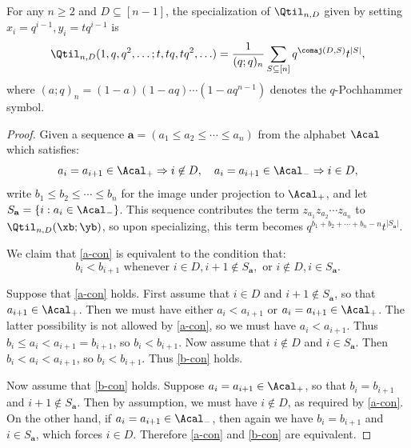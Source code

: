 
\begin{prop}\label{prop:q-ps}
    For any $n \ge 2$ and $D \subseteq [n-1]$, the specialization of $\Qtil_{n,D}$ given by setting $x_i = q^{i-1}, y_i = tq^{i-1}$ is
    \[
    \Qtil_{n,D}(1,q,q^2,\ldots;t,tq,tq^2,\ldots) = \frac{1}{(q;q)_n} \sum_{S \subseteq [n]} q^{\comaj(D,S)}t^{|S|},
    \]
    where $(a;q)_n = (1-a)(1-aq) \cdots (1-aq^{n-1})$ denotes the $q$-Pochhammer symbol.
\end{prop}
\begin{proof}
    Given a sequence $\mathbf{a} = (a_1 \le a_2 \le \cdots \le a_n)$ from the alphabet $\Acal$ which satisfies:
    \begin{equation}\label{a-con}
a_i = a_{i+1} \in \Acal_+ \Rightarrow i \not\in D, \quad a_i = a_{i+1} \in \Acal_- \Rightarrow i \in D,
\end{equation}
write $b_1 \le b_2 \le \cdots \le b_n$ for the image under projection to $\Acal_+$, and let $S_\mathbf{a} = \{ i : a_i \in \Acal_- \}$. This sequence contributes the term $z_{a_1}z_{a_2} \cdots z_{a_n}$ to $\Qtil_{n,D}(\xb;\yb)$, so upon specializing, this term becomes $q^{b_1 + b_2 + \cdots + b_n - n}t^{|S_\mathbf{a}|}$. 

We claim that \eqref{a-con} is equivalent to the condition that:
    \begin{equation}\label{b-con}
    b_i < b_{i+1} \text{ whenever } i \in D, i+1 \not\in S_\mathbf{a}, \text{ or } i \not\in D, i \in S_\mathbf{a}.
    \end{equation}
    
    Suppose that \eqref{a-con} holds. First assume that $i \in D$ and $i+1 \not\in S_\mathbf{a}$, so that $a_{i+1} \in \Acal_+$. Then we must have either $a_i < a_{i+1}$ or $a_i = a_{i+1} \in \Acal_+$. The latter possibility is not allowed by \eqref{a-con}, so we must have $a_i < a_{i+1}$. Thus $b_i \le a_i < a_{i+1} = b_{i+1}$, so $b_i < b_{i+1}$. Now assume that $i \not\in D$ and $i \in S_\mathbf{a}$. Then $b_i < a_i < a_{i+1}$, so $b_i < b_{i+1}$. Thus \eqref{b-con} holds.
    
    Now assume that \eqref{b-con} holds. Suppose $a_i = a_{i+1} \in \Acal_+$, so that $b_i = b_{i+1}$ and $i+1 \not\in S_\mathbf{a}$. Then by assumption, we must have $i \not\in D$, as required by \eqref{a-con}. On the other hand, if $a_i = a_{i+1} \in \Acal_-$, then again we have $b_i = b_{i+1}$ and $i \in S_\mathbf{a}$, which forces $i \in D$. Therefore \eqref{a-con} and \eqref{b-con} are equivalent.


\end{proof}
